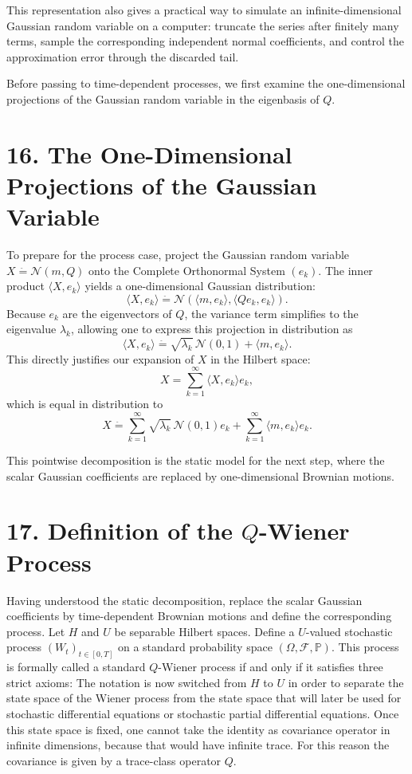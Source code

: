 \documentclass[11pt]{article}
\theoremstyle{definition}
\theoremstyle{remark}
\begin{document}
This representation also gives a practical way to simulate an infinite-dimensional Gaussian random variable on a computer: truncate the series after finitely many terms, sample the corresponding independent normal coefficients, and control the approximation error through the discarded tail.

Before passing to time-dependent processes, we first examine the one-dimensional projections of the Gaussian random variable in the eigenbasis of \(Q\).

\section*{16. The One-Dimensional Projections of the Gaussian Variable}
To prepare for the process case, project the Gaussian random variable \(X\stackrel{\hat{\ }}{=}\mathcal N(m,Q)\) onto the Complete Orthonormal System \((e_k)\). The inner product \(\langle X,e_k\rangle\) yields a one-dimensional Gaussian distribution:
\[
\langle X,e_k\rangle\stackrel{\hat{\ }}{=}\mathcal N(\langle m,e_k\rangle,\langle Qe_k,e_k\rangle).
\]
Because \(e_k\) are the eigenvectors of \(Q\), the variance term simplifies to the eigenvalue \(\lambda_k\), allowing one to express this projection in distribution as
\[
\langle X,e_k\rangle\stackrel{\hat{\ }}{=}\sqrt{\lambda_k}\,\mathcal N(0,1)+\langle m,e_k\rangle.
\]
This directly justifies our expansion of \(X\) in the Hilbert space:
\[
X=\sum_{k=1}^\infty \langle X,e_k\rangle e_k,
\]
which is equal in distribution to
\[
X\stackrel{\hat{\ }}{=}\sum_{k=1}^\infty \sqrt{\lambda_k}\,\mathcal N(0,1)e_k+\sum_{k=1}^\infty \langle m,e_k\rangle e_k.
\]

This pointwise decomposition is the static model for the next step, where the scalar Gaussian coefficients are replaced by one-dimensional Brownian motions.

\section*{17. Definition of the \(Q\)-Wiener Process}
Having understood the static decomposition, replace the scalar Gaussian coefficients by time-dependent Brownian motions and define the corresponding process. Let \(H\) and \(U\) be separable Hilbert spaces. Define a \(U\)-valued stochastic process \((W_t)_{t\in[0,T]}\) on a standard probability space \((\Omega,\mathcal F,\mathbb P)\). This process is formally called a standard \(Q\)-Wiener process if and only if it satisfies three strict axioms:
The notation is now switched from \(H\) to \(U\) in order to separate the state space of the Wiener process from the state space that will later be used for stochastic differential equations or stochastic partial differential equations. Once this state space is fixed, one cannot take the identity as covariance operator in infinite dimensions, because that would have infinite trace. For this reason the covariance is given by a trace-class operator \(Q\).
\end{document}
